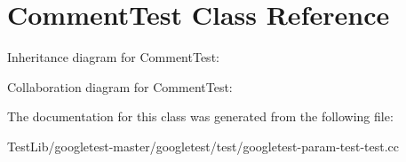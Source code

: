 \hypertarget{classCommentTest}{}\section{Comment\+Test Class Reference}
\label{classCommentTest}


Inheritance diagram for Comment\+Test\+:


Collaboration diagram for Comment\+Test\+:


The documentation for this class was generated from the following file\+:\begin{DoxyCompactItemize}
\item 
Test\+Lib/googletest-\/master/googletest/test/googletest-\/param-\/test-\/test.\+cc\end{DoxyCompactItemize}

